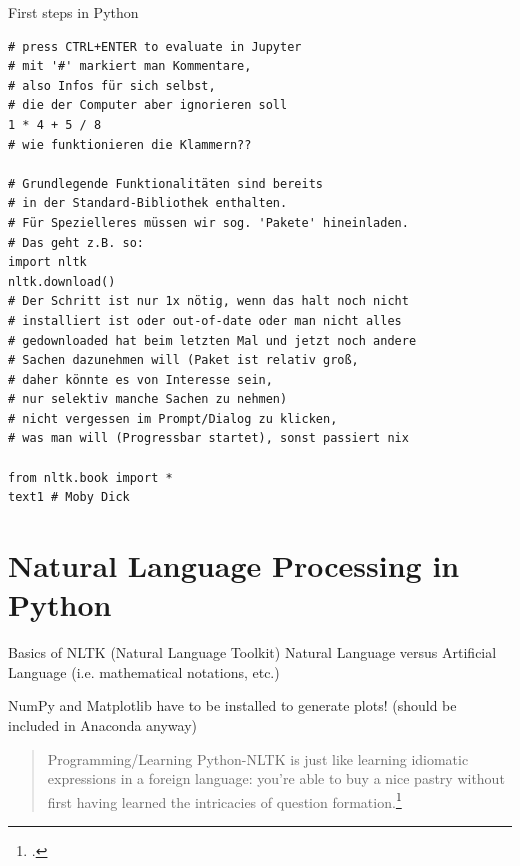 \documentclass[10pt]{beamer}
\begin{document}
\begin{frame}{First steps in Python} 
\begin{verbatim}
# press CTRL+ENTER to evaluate in Jupyter
# mit '#' markiert man Kommentare, 
# also Infos für sich selbst, 
# die der Computer aber ignorieren soll
1 * 4 + 5 / 8
# wie funktionieren die Klammern??

# Grundlegende Funktionalitäten sind bereits 
# in der Standard-Bibliothek enthalten. 
# Für Spezielleres müssen wir sog. 'Pakete' hineinladen. 
# Das geht z.B. so:
import nltk 
nltk.download() 
# Der Schritt ist nur 1x nötig, wenn das halt noch nicht
# installiert ist oder out-of-date oder man nicht alles 
# gedownloaded hat beim letzten Mal und jetzt noch andere 
# Sachen dazunehmen will (Paket ist relativ groß, 
# daher könnte es von Interesse sein, 
# nur selektiv manche Sachen zu nehmen)
# nicht vergessen im Prompt/Dialog zu klicken,
# was man will (Progressbar startet), sonst passiert nix

from nltk.book import *
text1 # Moby Dick
\end{verbatim}
\end{frame}


\section{Natural Language Processing in Python}


\begin{frame}{Basics of NLTK (Natural Language Toolkit)}
Natural Language versus Artificial Language (i.e. mathematical notations, etc.)

NumPy and Matplotlib have to be installed to generate plots! (should be included in Anaconda anyway)

\begin{quote}
    \lbrack{}Programming/Learning Python-NLTK\rbrack{} is just like learning idiomatic expressions in a foreign language: you're able to buy a nice pastry without first having learned the intricacies of question formation.\footcite[xii]{pythonnltk}
\end{quote}

\end{frame}
\end{document}
